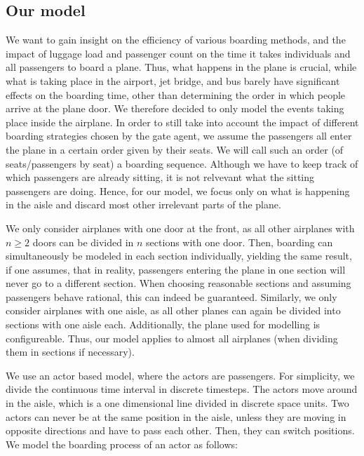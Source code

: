\documentclass[11pt]{article}
\begin{document}
\subsection{Our model}\label{ourmodel}

We want to gain insight on the efficiency of various boarding methods, and the impact of luggage load and passenger count on the time it takes individuals and all passengers to board a plane. Thus, what happens in the plane is crucial, while what is taking place in the airport, jet bridge, and bus barely have significant effects on the boarding time, other than determining the order in which people arrive at the plane door. We therefore decided to only model the events taking place inside the airplane. In order to still take into account the impact of different boarding strategies chosen by the gate agent, we assume the passengers all enter the plane in a certain order given by their seats. We will call such an order (of seats/passengers by seat) a boarding sequence.
Although we have to keep track of which passengers are already sitting, it is not relvevant what the sitting passengers are doing. Hence, for our model, we focus only on what is happening in the aisle and discard most other irrelevant parts of the plane.

We only consider airplanes with one door at the front, as all other airplanes with $n \geq 2$ doors can be divided in $n$ sections with one door. Then, boarding can simultaneously be modeled in each section individually, yielding the same result, if one assumes, that in reality, passengers entering the plane in one section will never go to a different section.
When choosing reasonable sections and assuming passengers behave rational, this can indeed be guaranteed. Similarly, we only consider airplanes with one aisle, as all other planes can again be divided into sections with one aisle each. Additionally, the plane used for modelling is configureable. Thus, our model applies to almost all airplanes (when dividing them in sections if necessary).

We use an actor based model, where the actors are passengers. For simplicity, we divide the continuous time interval in discrete timesteps. The actors move around in the aisle, which is a one dimensional line divided in discrete space units. Two actors can never be at the same position in the aisle, unless they are moving in opposite directions and have to pass each other. Then, they can switch positions. We model the boarding process of an actor as follows:
\end{document}
